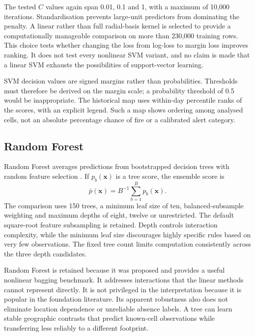 \documentclass[conference,a4paper]{IEEEtran}
\begin{document}
The tested $C$ values again span 0.01, 0.1 and 1, with a maximum of 10,000 iterations. Standardisation prevents large-unit predictors from dominating the penalty. A linear rather than full radial-basis kernel is selected to provide a computationally manageable comparison on more than 230,000 training rows. This choice tests whether changing the loss from log-loss to margin loss improves ranking. It does not test every nonlinear SVM variant, and no claim is made that a linear SVM exhausts the possibilities of support-vector learning.

SVM decision values are signed margins rather than probabilities. Thresholds must therefore be derived on the margin scale; a probability threshold of 0.5 would be inappropriate. The historical map uses within-day percentile ranks of the scores, with an explicit legend. Such a map shows ordering among analysed cells, not an absolute percentage chance of fire or a calibrated alert category.

\subsection{Random Forest}
Random Forest averages predictions from bootstrapped decision trees with random feature selection \citep{breiman}. If $p_b(\mathbf x)$ is a tree score, the ensemble score is
\begin{equation}
\bar p(\mathbf x)=B^{-1}\sum_{b=1}^{B}p_b(\mathbf x).
\end{equation}
The comparison uses 150 trees, a minimum leaf size of ten, balanced-subsample weighting and maximum depths of eight, twelve or unrestricted. The default square-root feature subsampling is retained. Depth controls interaction complexity, while the minimum leaf size discourages highly specific rules based on very few observations. The fixed tree count limits computation consistently across the three depth candidates.

Random Forest is retained because it was proposed and provides a useful nonlinear bagging benchmark. It addresses interactions that the linear methods cannot represent directly. It is not privileged in the interpretation because it is popular in the foundation literature. Its apparent robustness also does not eliminate location dependence or unreliable absence labels. A tree can learn stable geographic contrasts that predict known-cell observations while transferring less reliably to a different footprint.
\end{document}
